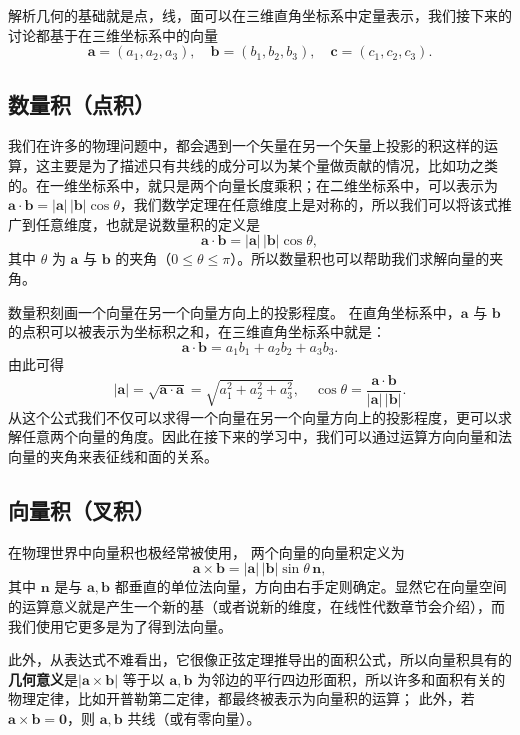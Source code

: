 \documentclass[UTF8]{ctexbook}
\begin{document}
解析几何的基础就是点，线，面可以在三维直角坐标系中定量表示，我们接下来的讨论都基于在三维坐标系中的向量
\[
\mathbf{a}=(a_1,a_2,a_3),\quad \mathbf{b}=(b_1,b_2,b_3),\quad \mathbf{c}=(c_1,c_2,c_3).
\]

\subsection{数量积（点积）}
\label{dotp}

我们在许多的物理问题中，都会遇到一个矢量在另一个矢量上投影的积这样的运算，这主要是为了描述只有共线的成分可以为某个量做贡献的情况，比如功之类的。在一维坐标系中，就只是两个向量长度乘积；在二维坐标系中，可以表示为$\mathbf{a}\cdot\mathbf{b}=|\mathbf{a}|\,|\mathbf{b}|\cos\theta$，我们数学定理在任意维度上是对称的，所以我们可以将该式推广到任意维度，也就是说数量积的定义是
\[
\mathbf{a}\cdot\mathbf{b}=|\mathbf{a}|\,|\mathbf{b}|\cos\theta,
\]
其中 $\theta$ 为 $\mathbf{a}$ 与 $\mathbf{b}$ 的夹角（$0\le \theta \le \pi$）。所以数量积也可以帮助我们求解向量的夹角。

数量积刻画一个向量在另一个向量方向上的投影程度。
在直角坐标系中，$\mathbf{a}$ 与 $\mathbf{b}$ 的点积可以被表示为坐标积之和，在三维直角坐标系中就是：
\[
\mathbf{a}\cdot\mathbf{b}=a_1b_1+a_2b_2+a_3b_3.
\]
由此可得
\[
|\mathbf{a}|=\sqrt{\mathbf{a}\cdot\mathbf{a}}=\sqrt{a_1^2+a_2^2+a_3^2},
\quad
\cos\theta=\frac{\mathbf{a}\cdot\mathbf{b}}{|\mathbf{a}|\,|\mathbf{b}|}.
\]
从这个公式我们不仅可以求得一个向量在另一个向量方向上的投影程度，更可以求解任意两个向量的角度。因此在接下来的学习中，我们可以通过运算方向向量和法向量的夹角来表征线和面的关系。


\subsection{向量积（叉积）}

在物理世界中向量积也极经常被使用，
两个向量的向量积定义为
\[
\mathbf{a}\times\mathbf{b}
=|\mathbf{a}|\,|\mathbf{b}|\sin\theta\,\mathbf{n},
\]
其中 $\mathbf{n}$ 是与 $\mathbf{a},\mathbf{b}$ 都垂直的单位法向量，方向由右手定则确定。显然它在向量空间的运算意义就是产生一个新的基（或者说新的维度，在线性代数章节会介绍），而我们使用它更多是为了得到法向量。

此外，从表达式不难看出，它很像正弦定理推导出的面积公式，所以向量积具有的\textbf{几何意义}是$|\mathbf{a}\times\mathbf{b}|$ 等于以 $\mathbf{a},\mathbf{b}$ 为邻边的平行四边形面积，所以许多和面积有关的物理定律，比如开普勒第二定律，都最终被表示为向量积的运算；
此外，若 $\mathbf{a}\times\mathbf{b}=\mathbf{0}$，则 $\mathbf{a},\mathbf{b}$ 共线（或有零向量）。
\end{document}
